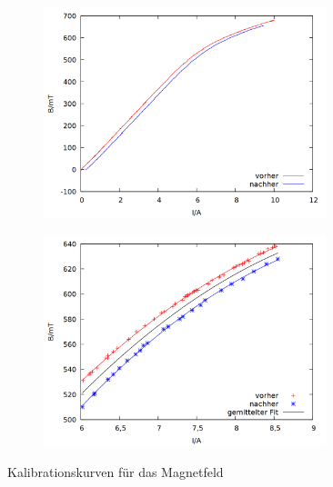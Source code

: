 \begin{figure}[h]
  \centering
  \begin{subfigure}[h]{0.5\textwidth}
    \centering
    \includegraphics[width=0.9\textwidth]{data/zeeman/out_kalibrierung.png}
    \label{fig:kal_raw}
  \end{subfigure}%
  \begin{subfigure}[h]{0.5\textwidth}
    \centering
    \includegraphics[width=0.9\textwidth]{data/zeeman/out_kalibrierung_edit.png}
    \label{fig:kal_raw_edit}
  \end{subfigure}
  \caption{Kalibrationskurven für das Magnetfeld}
\end{figure}

